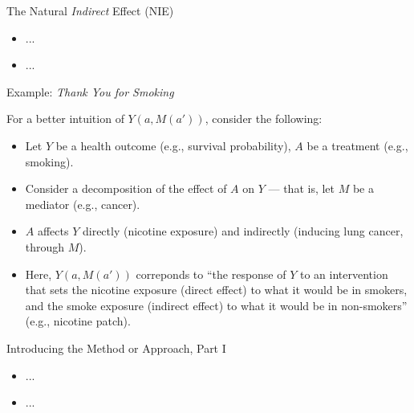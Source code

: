 \documentclass[12pt,t]{beamer}
\begin{document}
\begin{frame}[c]{The Natural \textit{Indirect} Effect (NIE)}

\begin{center}
\begin{itemize}
  \item ...
  \item ...
\end{itemize}
\end{center}


\end{frame}


\begin{frame}[c]{Example: \textit{Thank You for Smoking}}

For a better intuition of $Y(a, M(a'))$, consider the following:

\begin{center}
\begin{itemize}
  \itemsep4pt
  \item Let $Y$ be a health outcome (e.g., survival probability), $A$ be a
    treatment (e.g., smoking).
  \item Consider a decomposition of the effect of $A$ on $Y$ --- that is, let
    $M$ be a mediator (e.g., cancer).
  \item $A$ affects $Y$ directly (nicotine exposure) and indirectly (inducing
    lung cancer, through $M$).
  \item Here, $Y(a, M(a'))$ correponds to ``the response of $Y$ to an
    intervention that sets the nicotine exposure (direct effect) to what it
    would be in smokers, and the smoke exposure (indirect effect) to what it
    would be in non-smokers'' (e.g., nicotine patch).
\end{itemize}
\end{center}


\end{frame}


\begin{frame}[c]{Introducing the Method or Approach, Part I}

\begin{center}
\begin{itemize}
  \item ...
  \item ...
\end{itemize}
\end{center}


\end{frame}
\end{document}
